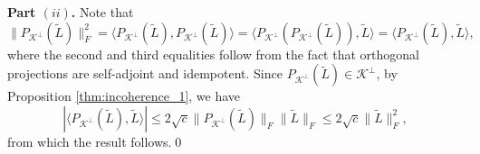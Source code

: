  \textbf{Part $(ii)$.} Note that
$$
\| P_{\mathcal{K}^\perp}(\tilde{L}) \|_F^2 = \langle P_{\mathcal{K}^\perp}(\tilde{L}), P_{\mathcal{K}^\perp}(\tilde{L}) \rangle = \langle P_{\mathcal{K}^\perp} (P_{\mathcal{K}^\perp}(\tilde{L})), \tilde{L} \rangle = \langle P_{\mathcal{K}^\perp}(\tilde{L}), \tilde{L} \rangle,
$$
where the second and third equalities  follow  from the fact that orthogonal projections are  self-adjoint and idempotent. 
 Since $P_{\mathcal{K}^\perp}(\tilde{L}) \in \mathcal{K}^\perp$, by Proposition \ref{thm:incoherence_1}, we have 
$$|\langle P_{\mathcal{K}^\perp}(\tilde{L}), \tilde{L} \rangle| \leq 2\sqrt{c} \|P_{\mathcal{K}^\perp}(\tilde{L})\|_F \|\tilde{L}\|_F \leq 2\sqrt{c} \|\tilde{L}\|_F^2,$$ from which the result follows.\qed



